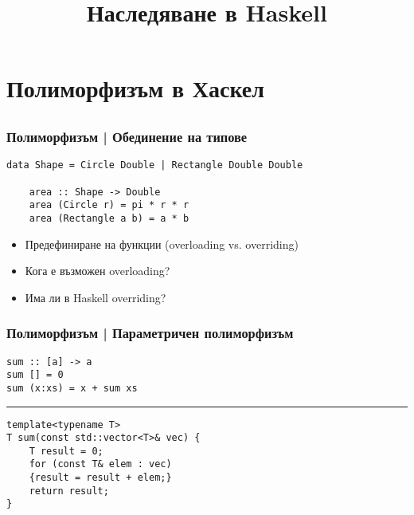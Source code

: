 \documentclass{beamer}
\begin{document}
\title[Наследяване]{Наследяване в Haskell}
\frame{\titlepage}

\section{Полиморфизъм в Хаскел}

\subsection{}
\begin{frame}[fragile]
\frametitle{Полиморфизъм | Обединение на типове}

  \begin{lstlisting}[basicstyle=\small]
    data Shape = Circle Double | Rectangle Double Double

    area :: Shape -> Double
    area (Circle r) = pi * r * r
    area (Rectangle a b) = a * b
  \end{lstlisting}

\begin{itemize}
  \item Предефиниране на функции (overloading vs. overriding)
  \item Кога е възможен overloading?
  \item Има ли в Haskell overriding?
\end{itemize}

\end{frame}

\begin{frame}[fragile]
\frametitle{Полиморфизъм | Параметричен полиморфизъм}

\begin{lstlisting}[basicstyle=\small]
sum :: [a] -> a
sum [] = 0
sum (x:xs) = x + sum xs
\end{lstlisting}

\begin{center}
\noindent\rule{6cm}{0.4pt}
\end{center}

\begin{lstlisting}[basicstyle=\small]
template<typename T>
T sum(const std::vector<T>& vec) {
    T result = 0;
    for (const T& elem : vec) 
    {result = result + elem;}
    return result;
}
\end{lstlisting}

\end{frame}
\end{document}
